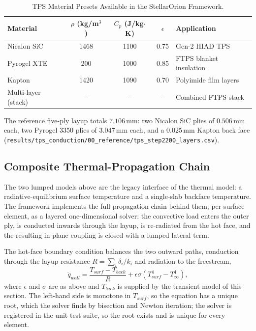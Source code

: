 \begin{table}[H]
    \centering
    \caption{TPS Material Presets Available in the StellarOrion Framework.}
    \label{tab:tps_materials}
    \begin{tabularx}{\textwidth}{|l|c|c|c|>{\RaggedRight\arraybackslash}X|}
        \hline
        \textbf{Material} & \textbf{$\rho$ (kg/m$^3$)} & \textbf{$C_p$ (J/kg$\cdot$K)} & \textbf{$\epsilon$} & \textbf{Application} \\ \hline
        Nicalon SiC & 1468 & 1100 & 0.75 & Gen-2 HIAD TPS \\ \hline
        Pyrogel XTE & 200 & 1000 & 0.85 & FTPS blanket insulation \\ \hline
        Kapton & 1420 & 1090 & 0.70 & Polyimide film layers \\ \hline
        Multi-layer (stack) & -- & -- & -- & Combined FTPS stack \\ \hline
    \end{tabularx}
\end{table}

\noindent The reference five-ply layup totals $7.106$\,mm: two Nicalon SiC plies of $0.506$\,mm each, two Pyrogel 3350 plies of $3.047$\,mm each, and a $0.025$\,mm Kapton back face (\texttt{results/tps\_conduction/00\_reference/tps\_step2200\_layers.csv}).

\subsection{Composite Thermal-Propagation Chain}
\label{sec:thermal_chain}

The two lumped models above are the legacy interface of the thermal model: a radiative-equilibrium surface temperature and a single-slab backface temperature. The framework implements the full propagation chain behind them, per surface element, as a layered one-dimensional solver: the convective load enters the outer ply, is conducted inwards through the layup, is re-radiated from the hot face, and the resulting in-plane coupling is closed with a lumped lateral term.

The hot-face boundary condition balances the two outward paths, conduction through the layup resistance $R=\sum_i \delta_i/k_i$ and radiation to the freestream,
\begin{equation}
    \dot{q}_{wall} = \frac{T_{surf}-T_{back}}{R} + \epsilon\sigma\left(T_{surf}^{4}-T_{\infty}^{4}\right),
    \label{eq:thermal_balance}
\end{equation}
where $\epsilon$ and $\sigma$ are as above and $T_{back}$ is supplied by the transient model of this section. The left-hand side is monotone in $T_{surf}$, so the equation has a unique root, which the solver finds by bisection and Newton iteration; the solver is registered in the unit-test suite, so the root exists and is unique for every element.

